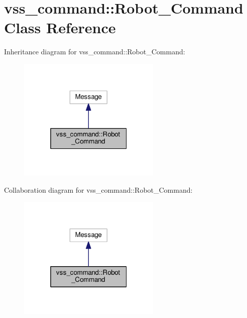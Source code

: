 \hypertarget{classvss__command_1_1Robot__Command}{}\section{vss\+\_\+command\+:\+:Robot\+\_\+\+Command Class Reference}
\label{classvss__command_1_1Robot__Command}


Inheritance diagram for vss\+\_\+command\+:\+:Robot\+\_\+\+Command\+:\nopagebreak
\begin{figure}[H]
\begin{center}
\leavevmode
\includegraphics[width=193pt]{classvss__command_1_1Robot__Command__inherit__graph}
\end{center}
\end{figure}


Collaboration diagram for vss\+\_\+command\+:\+:Robot\+\_\+\+Command\+:\nopagebreak
\begin{figure}[H]
\begin{center}
\leavevmode
\includegraphics[width=193pt]{classvss__command_1_1Robot__Command__coll__graph}
\end{center}
\end{figure}
